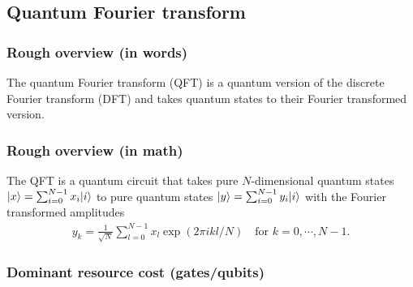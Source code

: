 
\begin{refsection}

\section{Quantum Fourier transform}\label{prim:QFT}

\subsubsection*{Rough overview (in words)}

The quantum Fourier transform (QFT) is a quantum version of the discrete Fourier transform (DFT) and takes quantum states to their Fourier transformed version.


\subsubsection*{Rough overview (in math)}

The QFT is a quantum circuit that takes pure $N$-dimensional quantum states $\lvert x\rangle=\sum_{i=0}^{N-1}x_i\lvert i\rangle$ to pure quantum states $\lvert y\rangle=\sum_{i=0}^{N-1}y_i\lvert i\rangle$ with the Fourier transformed amplitudes
\begin{align}\label{eq:Fourier}
y_k=\frac{1}{\sqrt{N}}\sum_{l=0}^{N-1}x_l\exp(2\pi ikl/N)\quad\text{for }k=0,\cdots,N-1.
\end{align}


\subsubsection*{Dominant resource cost (gates/qubits)}


\end{refsection}
